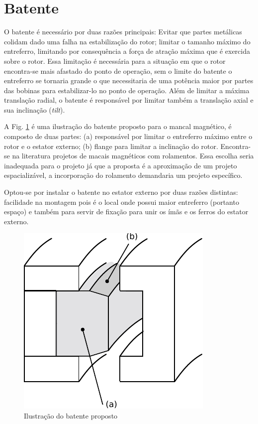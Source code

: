 \section{Batente}

 O batente é necessário por duas razões principais: Evitar que partes metálicas colidam dado uma falha na estabilização do rotor; limitar o tamanho máximo do entreferro, limitando por consequência a força de atração máxima que é exercida sobre o rotor.  Essa limitação é necessária para a situação em que o rotor encontra-se mais afastado do ponto de operação, sem o limite do batente o entreferro se tornaria grande o que necessitaria de uma potência maior por partes das bobinas para estabilizar-lo no ponto de operação.  Além de limitar a máxima translação radial, o batente é responsável por limitar também a translação axial e sua inclinação (\textit{tilt}).
 
 A Fig. \ref{fig:mancal:batente:corte} é uma ilustração do batente proposto para o mancal magnético, é composto de duas partes: (a) responsável por limitar o entreferro máximo entre o rotor e o estator externo; (b) flange para limitar a inclinação do rotor. Encontra-se na literatura projetos de macais magnéticos com rolamentos. Essa escolha seria inadequada para o projeto já que a proposta é a aproximação de um projeto espacializável, a incorporação do rolamento demandaria um projeto específico.
 
Optou-se por instalar o batente no estator externo por duas razões distintas: facilidade na montagem pois  é o local onde possui maior entreferro (portanto espaço) e também para servir de fixação para unir os ímãs e os ferros do estator externo. 

\begin{figure}[th!]
\centering
\includegraphics[width=0.4\linewidth]{./Figs/mancais/mancal_batente_corte}
\caption{Ilustração do batente proposto}
\label{fig:mancal:batente:corte}
\end{figure}



